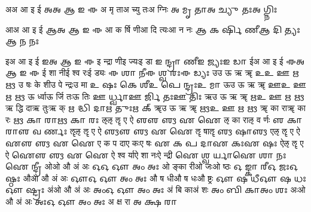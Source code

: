 \documentclass{article}
\begin{document}
\card
{अ}{अ आ इ ई}%
{𑌅}{𑌅 𑌆 𑌇 𑌈}
{{अ मृ ता}{अ च्यु तः}{अ ग्निः}}%
{{𑌅 𑌮𑍃 𑌤𑌾}{𑌅 𑌚𑍍𑌯𑍁 𑌤𑌃}{𑌅 𑌗𑍍𑌨𑌿𑌃}}

\card
{आ}{अ आ इ ई}%
{𑌆}{𑌅 𑌆 𑌇 𑌈}
{{आ क र्षि णी}{आ दि त्यः}{आ न नः}}%
{{𑌆 𑌕 𑌰𑍍𑌷𑌿 𑌣𑍀}{𑌆 𑌦𑌿 𑌤𑍍𑌯𑌃}{𑌆 𑌨 𑌨𑌃}}

\card
{इ}{अ आ इ ई}%
{𑌇}{𑌅 𑌆 𑌇 𑌈}
{{इ न्द्रा णी}{इ ज्यः}{इ डा}}%
{{𑌇 𑌨𑍍𑌦𑍍𑌰𑌾 𑌣𑍀}{𑌇 𑌜𑍍𑌯𑌃}{𑌇 𑌡𑌾}}
\card
{ई}{अ आ इ ई}%
{𑌈}{𑌅 𑌆 𑌇 𑌈}
{{ई शा नी}{ई श्व रः}{ई ड्यः}}%
{{𑌈 𑌶𑌾 𑌨𑍀}{𑌈 𑌶𑍍𑌵 𑌰𑌃}{𑌈 𑌡𑍍𑌯𑌃}}
\card
{उ}{उ ऊ ऋ ॠ}%
{𑌉}{𑌉 𑌊 𑌋 𑍠}
{{उ षः के शी}{उ पे न्द्रः}{उ मा}}%
{{𑌉 𑌷𑌃 𑌕𑍇 𑌶𑍀}{𑌉 𑌪𑍇 𑌨𑍍𑌦𑍍𑌰𑌃}{𑌉 𑌮𑌾}}
\card
{ऊ}{उ ऊ ऋ ॠ}%
{𑌊}{𑌉 𑌊 𑌋 𑍠}
{{ऊ र्ध्वा}{ऊ र्जि तः}{ऊ तिः}}%
{{𑌊 𑌰𑍍𑌧𑍍𑌵𑌾}{𑌊 𑌰𑍍𑌜𑌿 𑌤𑌃}{𑌊 𑌤𑌿𑌃}}
\card
{ऋ}{उ ऊ ऋ ॠ}%
{𑌋}{𑌉 𑌊 𑌋 𑍠}
{{ऋ द्धि दा}{ऋ तुः}{ऋ क्}}%
{{𑌋 𑌦𑍍𑌧𑌿 𑌦𑌾}{𑌋 𑌤𑍁𑌃}{𑌋 𑌕𑍍}}
\card
{ॠ}{उ ऊ ऋ ॠ}%
{𑍠}{𑌉 𑌊 𑌋 𑍠}
{{ॠ का रा}{ॠ का रः}{ }}%
{{𑍠 𑌕𑌾 𑌰𑌾}{𑍠 𑌕𑌾 𑌰𑌃}{ }}
\card
{ऌ}{ऌ ॡ ए ऐ}%
{𑌌}{𑌌 𑍡 𑌏 𑌐}
{{ऌ का रा}{ऌ व र्णः}{ }}%
{{𑌌 𑌕𑌾 𑌰𑌾}{𑌌 𑌵 𑌰𑍍𑌣𑌃}{ }}
\card
{ॡ}{ऌ ॡ ए ऐ}%
{𑍡}{𑌌 𑍡 𑌏 𑌐}
{{ॡ षा}{ॡ}{ }}%
{{𑍡 𑌷𑌾}{𑍡}{ }}
\card
{ए}{ऌ ॡ ए ऐ}%
{𑌏}{𑌌 𑍡 𑌏 𑌐}
{{ए क प दा}{ए कः}{ए षः}}%
{{𑌏 𑌕 𑌪 𑌦𑌾}{𑌏 𑌕𑌃}{𑌏 𑌷𑌃}}
\card
{ऐ}{ऌ ॡ ए ऐ}%
{𑌐}{𑌌 𑍡 𑌏 𑌐}
{{ऐ श्व र्या}{ऐ शा नः}{ऐ न्द्री}}%
{{𑌐 𑌶𑍍𑌵 𑌰𑍍𑌯𑌾}{𑌐 𑌶𑌾 𑌨𑌃}{𑌐 𑌨𑍍𑌦𑍍𑌰𑍀}}
\card
{ओ}{ओ औ अं अः}%
{𑌓}{𑌓 𑌔 𑌅𑌂 𑌅𑌃}
{{ओ ङ्का री}{ओ जः}{ओ ष्ठः}}%
{{𑌓 𑌙𑍍𑌕𑌾 𑌰𑍀}{𑌓 𑌜𑌃}{𑌓 𑌷𑍍𑌠𑌃}}
\card
{औ}{ओ औ अं अः}%
{𑌔}{𑌓 𑌔 𑌅𑌂 𑌅𑌃}
{{औ ष धी}{औ ष धः}{औ ष्ट्रः}}%
{{𑌔 𑌷 𑌧𑍀}{𑌔 𑌷 𑌧𑌃}{𑌔 𑌷𑍍𑌟𑍍𑌰𑌃}}
\card
{अं}{ओ औ अं अः}%
{𑌅𑌂}{𑌓 𑌔 𑌅𑌂 𑌅𑌃}
{{अं बि का}{अं शः}{ }}%
{{𑌅𑌂 𑌬𑌿 𑌕𑌾}{𑌅𑌂 𑌶𑌃}{ }}
\card
{अः}{ओ औ अं अः}%
{𑌅𑌃}{𑌓 𑌔 𑌅𑌂 𑌅𑌃}
{{अ क्ष रा}{ }{ }}%
{{𑌅 𑌕𑍍𑌷 𑌰𑌾}{ }{ }}
\end{document}
